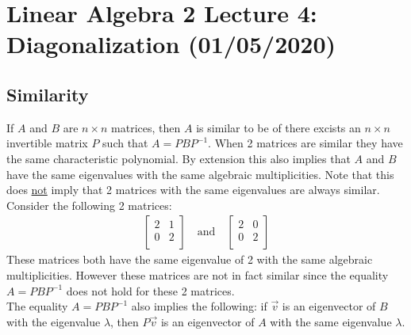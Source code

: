 \documentclass[11pt, a4paper]{article}
\begin{document}
\setcounter{section}{3}
\setcounter{equation}{0}
\section{Linear Algebra 2 Lecture 4: Diagonalization (01/05/2020)}


\subsection{Similarity}
If $A$ and $B$ are $n \times n$ matrices, then $A$ is similar to be of there excists an $n \times n$ invertible matrix $P$ such that $A=PBP^{-1}$. When 2 matrices are similar they have the same characteristic polynomial. By extension this also implies that $A$ and $B$ have the same eigenvalues with the same algebraic multiplicities. Note that this does \underline{not} imply that 2 matrices with the same eigenvalues are always similar. Consider the following 2 matrices:
\begin{gather*}
  \begin{bmatrix}
    2 & 1\\
    0 & 2\\
  \end{bmatrix}
  \quad \text{and} \quad
  \begin{bmatrix}
    2 & 0\\
    0 & 2\\
  \end{bmatrix}
\end{gather*}
These matrices both have the same eigenvalue of 2 with the same algebraic multiplicities. However these matrices are not in fact similar since the equality $A=PBP^{-1}$ does not hold for these 2 matrices.\\
The equality $A=PBP^{-1}$ also implies the following: if $\vec{v}$ is an eigenvector of $B$ with the eigenvalue $\lambda$, then $P\vec{v}$ is an eigenvector of $A$ with the same eigenvalue $\lambda$.
\end{document}
